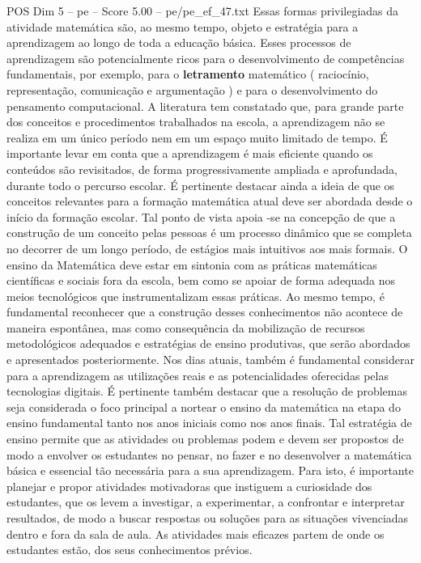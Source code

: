\begin{textsample}{POS Dim 5 – pe – Score 5.00 – pe/pe\_ef\_47.txt}
Essas formas privilegiadas da atividade matemática são, ao mesmo tempo, objeto e estratégia para a aprendizagem ao longo de toda a educação básica.
Esses processos de aprendizagem são potencialmente ricos para o desenvolvimento de competências fundamentais, por exemplo, para o \textbf{letramento} matemático ( raciocínio, representação, comunicação e argumentação ) e para o desenvolvimento do pensamento computacional.
A literatura tem constatado que, para grande parte dos conceitos e procedimentos trabalhados na escola, a aprendizagem não se realiza em um único período nem em um espaço muito limitado de tempo.
É importante levar em conta que a aprendizagem é mais eficiente quando os conteúdos são revisitados, de forma progressivamente ampliada e aprofundada, durante todo o percurso escolar.
É pertinente destacar ainda a ideia de que os conceitos relevantes para a formação matemática atual deve ser abordada desde o início da formação escolar.
Tal ponto de vista apoia -se na concepção de que a construção de um conceito pelas pessoas é um processo dinâmico que se completa no decorrer de um longo período, de estágios mais intuitivos aos mais formais.
O ensino da Matemática deve estar em sintonia com as práticas matemáticas científicas e sociais fora da escola, bem como se apoiar de forma adequada nos meios tecnológicos que instrumentalizam essas práticas.
Ao mesmo tempo, é fundamental reconhecer que a construção desses conhecimentos não acontece de maneira espontânea, mas como consequência da mobilização de recursos metodológicos adequados e estratégias de ensino produtivas, que serão abordados e apresentados posteriormente.
Nos dias atuais, também é fundamental considerar para a aprendizagem as utilizações reais e as potencialidades oferecidas pelas tecnologias digitais.
É pertinente também destacar que a resolução de problemas seja considerada o foco principal a nortear o ensino da matemática na etapa do ensino fundamental tanto nos anos iniciais como nos anos finais.
Tal estratégia de ensino permite que as atividades ou problemas podem e devem ser propostos de modo a envolver os estudantes no pensar, no fazer e no desenvolver a matemática básica e essencial tão necessária para a sua aprendizagem.
Para isto, é importante planejar e propor atividades motivadoras que instiguem a curiosidade dos estudantes, que os levem a investigar, a experimentar, a confrontar e interpretar resultados, de modo a buscar respostas ou soluções para as situações vivenciadas dentro e fora da sala de aula.
As atividades mais eficazes partem de onde os estudantes estão, dos seus conhecimentos prévios.

\end{textsample}
